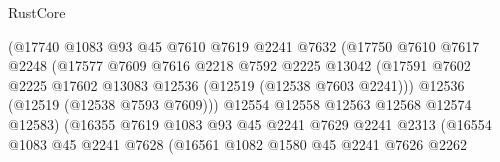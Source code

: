 \begin{lexlean}{RustCore}
\begin{coremodule}
                                    (@17740
                                      @1083
                                      @93
                                      @45
                                      @7610
                                      @7619
                                      @2241
                                      @7632
                                      (@17750
                                        @7610
                                        @7617
                                        @2248
                                        (@17577
                                          @7609
                                          @7616
                                          @2218
                                          @7592
                                          @2225
                                          @13042
                                          (@17591
                                            @7602
                                            @2225
                                            @17602
                                            @13083
                                            @12536
                                            (@12519 (@12538 @7603 @2241)))
                                          @12536
                                          (@12519 (@12538 @7593 @7609)))
                                        @12554
                                        @12558
                                        @12563
                                        @12568
                                        @12574
                                        @12583)
                                      (@16355
                                        @7619
                                        @1083
                                        @93
                                        @45
                                        @2241
                                        @7629
                                        @2241
                                        @2313
                                        (@16554
                                          @1083
                                          @45
                                          @2241
                                          @7628
                                          (@16561
                                            @1082
                                            @1580
                                            @45
                                            @2241
                                            @7626
                                            @2262

\end{coremodule}
\end{lexlean}
